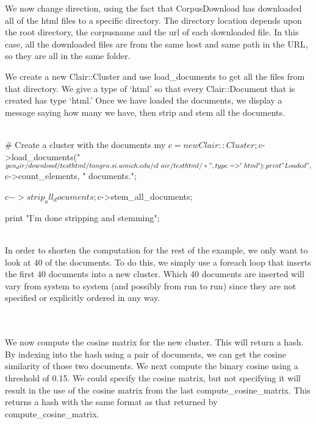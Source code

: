 We now change direction, using the fact that CorpusDownload has
downloaded all of the html files to a specific directory.  The
directory location depends upon the root directory, the corpusname
and the url of each downloaded file.  In this case, all the
downloaded files are from the same host and same path in the URL,
so they are all in the same folder.

We create a new Clair::Cluster and use load\_documents to get all
the files from that directory.  We give a type of `html' so that
every Clair::Document that is created has type `html.'  Once we
have loaded the documents, we display a message saying how many
we have, then strip and stem all the documents.
\\
\\
\begin{boxedverbatim}

# Create a cluster with the documents
my $c = new Clair::Cluster;

$c->load_documents("$gen_dir/download/testhtml/tangra.si.umich.edu/cl \
air/testhtml/*", type => 'html');

print "Loaded ", $c->count_elements, " documents.\n";

$c->strip_all_documents;
$c->stem_all_documents;

print "I'm done stripping and stemming\n";


\end{boxedverbatim}
\\

In order to shorten the computation for the rest of the example,
we only want to look at 40 of the documents.  To do this, we
simply use a foreach loop that inserts the first 40 documents
into a new cluster.  Which 40 documents are inserted will vary
from system to system (and possibly from run to run) since they
are not specified or explicitly ordered in any way.
\\
\\
\\

We now compute the cosine matrix for the new cluster.  This will
return a hash.  By indexing into the hash using a pair of documents,
we can get the cosine similarity of those two documents.  We next
compute the binary cosine using a threshold of 0.15.  We could
specify the cosine matrix, but not specifying it will result in the use of the
cosine matrix from the last compute\_cosine\_matrix.  This returns
a hash with the same format as that returned by compute\_cosine\_matrix.

